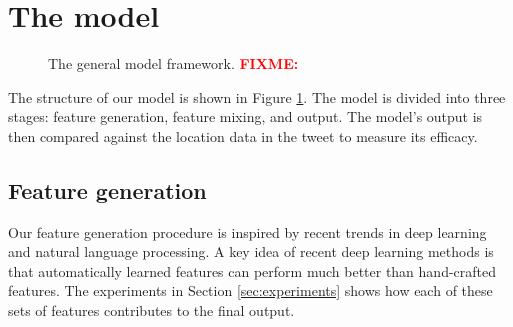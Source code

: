 \documentclass[sigconf,10pt]{acmart}
\newcommand{\fixme}[1]{\textcolor{red}{\textbf{FIXME:} {#1}}}
\begin{document}
\section{The model}

\begin{figure}
    \centering
    \caption{The general model framework. \fixme{}}
    \label{fig:model}
\end{figure}


The structure of our model is shown in Figure \ref{fig:model}.
The model is divided into three stages:
feature generation, feature mixing, and output.
The model's output is then compared against the location data in the tweet to measure its efficacy.

\subsection{Feature generation}

Our feature generation procedure is inspired by recent trends in deep learning and natural language processing.
A key idea of recent deep learning methods is that automatically learned features can perform much better than hand-crafted features.
The experiments in Section \ref{sec:experiments} shows how each of these sets of features contributes to the final output.
\end{document}
